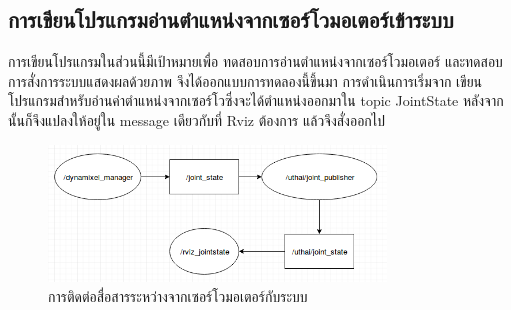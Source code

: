 \subsection{การเขียนโปรแกรมอ่านตำแหน่งจากเซอร์โวมอเตอร์เข้าระบบ}
การเขียนโปรแกรมในส่วนนี้มีเป้าหมายเพื่อ ทดสอบการอ่านตำแหน่งจากเซอร์โวมอเตอร์
และทดสอบการสั่งการระบบแสดงผลด้วยภาพ จึงได้ออกแบบการทดลองนี้ขึ้นมา
การดำเนินการเริ่มจาก เขียนโปรแกรมสำหรับอ่านค่าตำแหน่งจากเซอร์โวซึ่งจะได้ตำแหน่งออกมาใน topic
JointState หลังจากนั้นก็จึงแปลงให้อยู่ใน message เดียวกับที่ Rviz ต้องการ แล้วจึงสั่งออกไป
\begin{figure}[!ht]
	\centering
	\includegraphics[width=0.8\textwidth]{chapter3/images/rviz_joint_state.png}
	\caption{การติดต่อสื่อสารระหว่างจากเซอร์โวมอเตอร์กับระบบ}
\end{figure}
